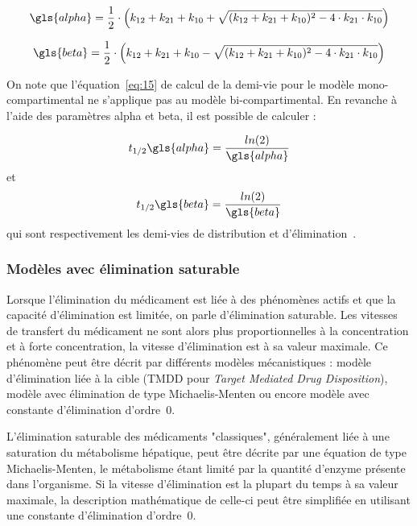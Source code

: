 \begin{equation}
\gls{alpha} = \frac{1}{2}\cdot \left(k_{12}+k_{21}+k_{10}+\sqrt{(k_{12}+k_{21}+k_{10})^2-4\cdot k_{21}\cdot k_{10}} \right)
\label{eq:29}
\end{equation}

\begin{equation}
\gls{beta} = \frac{1}{2}\cdot\left(k_{12}+k_{21}+k_{10}-\sqrt{(k_{12}+k_{21}+k_{10})^2-4\cdot k_{21}\cdot k_{10}}\right)
\label{eq:30}
\end{equation}

On note que l'équation~\ref{eq:15} de calcul de la demi-vie pour le modèle mono-compartimental ne s'applique pas au modèle bi-compartimental. En revanche à l'aide des paramètres \gls{alpha} et \gls{beta}, il est possible de calculer :

\begin{equation}
t_{1/2}\gls{alpha} = \frac{ln(2)}{\gls{alpha}}
\label{eq:31}
\end{equation}
et
\begin{equation}
t_{1/2}\gls{beta}  = \frac{ln(2)}{\gls{beta}} 
\label{eq:32}
\end{equation}
qui sont respectivement les demi-vies de distribution et d'élimination~\citep{REF2}.

\subsubsection{Modèles avec élimination saturable}
Lorsque l'élimination du médicament est liée à des phénomènes actifs et que la capacité d'élimination est limitée, on parle d'élimination saturable. Les vitesses de transfert du médicament ne sont alors plus proportionnelles à la concentration et à forte concentration, la vitesse d'élimination est à sa valeur maximale. Ce phénomène peut être décrit par différents modèles mécanistiques : modèle d'élimination liée à la cible (TMDD pour \textit{Target Mediated Drug Disposition}), modèle avec élimination de type Michaelis-Menten ou encore modèle avec constante d'élimination d'ordre~0. 

L'élimination saturable des médicaments "classiques", généralement liée à une saturation du métabolisme hépatique, peut être décrite par une équation de type Michaelis-Menten, le métabolisme étant limité par la quantité d'enzyme présente dans l'organisme. Si la vitesse d'élimination est la plupart du temps à sa valeur maximale, la description mathématique de celle-ci peut être simplifiée en utilisant une constante d'élimination d'ordre~0.
